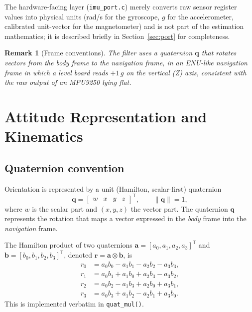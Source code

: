 \documentclass[11pt]{article}
\newtheorem{remark}{Remark}
\newcommand{\vect}[1]{\bm{#1}}
\newcommand{\quat}{\vect{q}}
\newcommand{\transpose}{^{\mathsf{T}}}
\begin{document}
The hardware-facing layer (\texttt{imu\_port.c}) merely converts raw sensor register values into physical units (rad/s for the gyroscope, $g$ for the accelerometer, calibrated unit-vector for the magnetometer) and is not part of the estimation mathematics; it is described briefly in Section~\ref{sec:port} for completeness.

\begin{remark}[Frame conventions]
The filter uses a quaternion $\quat$ that rotates vectors from the \emph{body} frame to the \emph{navigation} frame, in an ENU-like navigation frame in which a level board reads $+1\,g$ on the vertical (Z) axis, consistent with the raw output of an MPU9250 lying flat.
\end{remark}

\section{Attitude Representation and Kinematics}

\subsection{Quaternion convention}

Orientation is represented by a unit (Hamilton, scalar-first) quaternion
\begin{equation}
    \quat = \begin{bmatrix} w & x & y & z \end{bmatrix}\transpose, \qquad \lVert \quat \rVert = 1,
\end{equation}
where $w$ is the scalar part and $(x,y,z)$ the vector part. The quaternion $\quat$ represents the rotation that maps a vector expressed in the \emph{body} frame into the \emph{navigation} frame.

The Hamilton product of two quaternions $\vect a=[a_0,a_1,a_2,a_3]\transpose$ and $\vect b=[b_0,b_1,b_2,b_3]\transpose$, denoted $\vect r = \vect a \otimes \vect b$, is
\begin{align}
r_0 &= a_0 b_0 - a_1 b_1 - a_2 b_2 - a_3 b_3, \\
r_1 &= a_0 b_1 + a_1 b_0 + a_2 b_3 - a_3 b_2, \\
r_2 &= a_0 b_2 - a_1 b_3 + a_2 b_0 + a_3 b_1, \\
r_3 &= a_0 b_3 + a_1 b_2 - a_2 b_1 + a_3 b_0 .
\end{align}
This is implemented verbatim in \texttt{quat\_mul()}.
\end{document}
